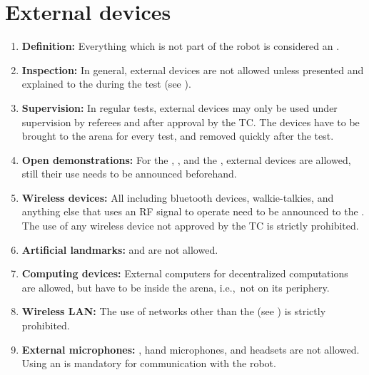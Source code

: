 \section{External devices}\label{rule:roobt_external_devices}
\begin{enumerate}
	\item \textbf{Definition:} Everything which is not part of the robot is considered an . 
	\item \textbf{Inspection:} In general, external devices are not allowed unless presented and explained to the  during the  test (see ).
	\item \textbf{Supervision:} In regular tests, external devices may only be used under supervision by referees and after approval by the TC. The devices have to be brought to the arena for every test, and removed quickly after the test.
	\item \textbf{Open demonstrations:} For the , , and the , external devices are allowed, still their use needs to be announced beforehand.
	\item \textbf{Wireless devices:} All  including bluetooth devices, walkie-talkies, and anything else that uses an RF signal to operate need to be announced to the . The use of any wireless device not approved by the TC is strictly prohibited.  
	\item \textbf{Artificial landmarks:}  and  are not allowed.
	\item \textbf{Computing devices:} External computers for decentralized computations are allowed, but have to be inside the arena, i.e.,~not on its periphery.
	\item \textbf{Wireless LAN:} The use of networks other than the  (see ) is strictly prohibited.
	\item \textbf{External microphones: }, hand microphones, and headsets are not allowed. Using an  is mandatory for communication with the robot.
\end{enumerate}


